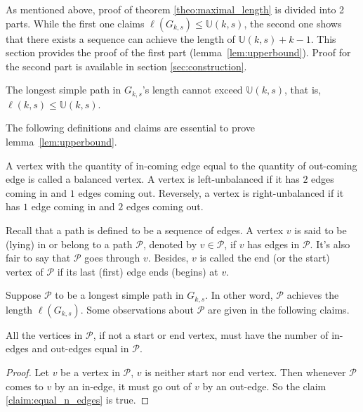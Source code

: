 As mentioned above, proof of theorem \ref{theo:maximal_length} is divided into 2 parts. While the first one claims $\ell(G_{k,s})\leq\mathbb{U}(k,s)$, the second one shows that there exists a sequence can achieve the length of $\mathbb{U}(k,s)+k-1$. This section provides the proof of the first part (lemma~\ref{lem:upperbound}). Proof for the second part is available in section \ref{sec:construction}. 
    
\begin{lemma}\label{lem:upperbound}
    The longest simple path in $G_{k,s}$'s length cannot exceed $\mathbb{U}(k,s)$, that is, $\ell(k,s)\leq\mathbb{U}(k,s)$.
\end{lemma}
    The following definitions and claims are essential to prove lemma~\ref{lem:upperbound}.  
    
\begin{definition}
    A vertex with the quantity of in-coming edge equal to the quantity of out-coming edge is called a balanced vertex. A vertex is left-unbalanced if it has $2$ edges coming in and $1$ edges coming out. Reversely, a vertex is right-unbalanced if it has $1$ edge coming in and $2$ edges coming out.
\end{definition}


Recall that a path is defined to be a sequence of edges. A vertex $v$ is said to be (lying) in or belong to a path $\mathcal{P}$, denoted by $v\in\mathscr{P}$, if $v$ has edges in $\mathcal{P}$. It's also fair to say that $\mathcal{P}$ goes through $v$. Besides, $v$ is called the end (or the start) vertex of $\mathcal{P}$ if its last (first) edge ends (begins) at $v$.

Suppose $\mathscr{P}$ to be a longest simple path in $G_{k,s}$. In other word, $\mathscr{P}$ achieves the length $\ell(G_{k,s})$. Some observations about $\mathscr{P}$ are given in the following claims.
\begin{claim}\label{claim:equal_n_edges}
    All the vertices in $\mathscr{P}$, if not a start or end vertex, must have the number of in-edges and out-edges equal in $\mathscr{P}$.
\end{claim}
\begin{proof}
    Let $v$ be a vertex in $\mathscr{P}$, $v$ is neither start nor end vertex. Then whenever $\mathscr{P}$ comes to $v$ by an in-edge, it must go out of $v$ by an out-edge. So the claim \ref{claim:equal_n_edges} is true.
\end{proof}

